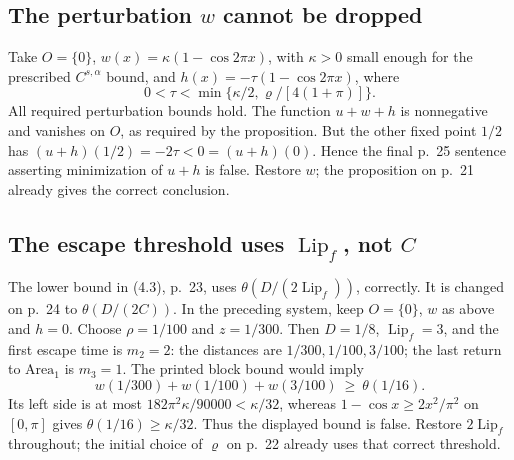 \documentclass[10pt]{article}
\begin{document}
\subsection*{The perturbation \(w\) cannot be dropped}
Take \(O=\{0\}\), \(w(x)=\kappa(1-\cos2\pi x)\), with \(\kappa>0\) small enough for the prescribed \(C^{s,\alpha}\) bound, and \(h(x)=-\tau(1-\cos2\pi x)\), where \[0<\tau<\min\{\kappa/2,\varrho/[4(1+\pi)]\}.\] All required perturbation bounds hold. The function \(u+w+h\) is nonnegative and vanishes on \(O\), as required by the proposition. But the other fixed point \(1/2\) has \((u+h)(1/2)=-2\tau<0=(u+h)(0)\). Hence the final p. 25 sentence asserting minimization of \(u+h\) is false. Restore \(w\); the proposition on p. 21 already gives the correct conclusion.\par
\subsection*{The escape threshold uses \(\operatorname{Lip}_f\), not \(C\)}
The lower bound in (4.3), p. 23, uses \(\theta(D/(2\operatorname{Lip}_f))\), correctly. It is changed on p. 24 to \(\theta(D/(2C))\). In the preceding system, keep \(O=\{0\}\), \(w\) as above and \(h=0\). Choose \(\rho=1/100\) and \(z=1/300\). Then \(D=1/8\), \(\operatorname{Lip}_f=3\), and the first escape time is \(m_2=2\): the distances are \(1/300,1/100,3/100\); the last return to \(\mathrm{Area}_1\) is \(m_3=1\). The printed block bound would imply \[w(1/300)+w(1/100)+w(3/100)\ \ge\ \theta(1/16).\] Its left side is at most \(182\pi^2\kappa/90000<\kappa/32\), whereas \(1-\cos x\ge2x^2/\pi^2\) on \([0,\pi]\) gives \(\theta(1/16)\ge\kappa/32\). Thus the displayed bound is false. Restore \(2\operatorname{Lip}_f\) throughout; the initial choice of \(\varrho\) on p. 22 already uses that correct threshold.\par
\end{document}
